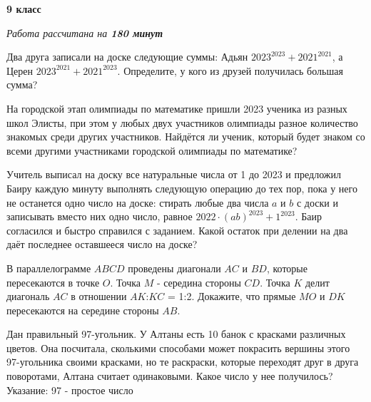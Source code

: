 \hspace{3mm}

\centerline{\bf \huge 9 класс}
\centerline{\normalsize{\it Работа рассчитана на \bf{180} минут}}

\hspace{3mm}

 Два друга записали на доске следующие суммы: Адьян $2023^{2023} + 2021^{2021}$, а Церен $2023^{2021} + 2021^{2023}.$ Определите, у кого из друзей получилась большая сумма?\

\hspace{3mm}

 На городской этап олимпиады по математике пришли 2023 ученика из разных школ Элисты, при этом у любых двух участников олимпиады разное количество знакомых среди других участников. Найдётся ли ученик, который будет знаком со всеми другими участниками городской олимпиады по математике? 

\hspace{3mm}

 Учитель выписал на доску все натуральные числа от 1 до 2023 и предложил Баиру каждую минуту выполнять следующую операцию до тех пор, пока у него не останется одно число на доске: стирать любые два числа $a$ и $b$ с доски и записывать вместо них одно число, равное $2022\cdot(ab)^{2023} + 1^{2023}$. Баир согласился и быстро справился с заданием. Какой остаток при делении на два даёт последнее оставшееся число на доске?

\hspace{3mm}

 В параллелограмме $ABCD$ проведены диагонали $AC$ и $BD$, которые пересекаются в точке $O$. Точка $M$ - середина стороны $CD$. Точка $K$ делит диагональ $AC$ в отношении $AK$:$KC$ = 1:2. Докажите, что прямые $MO$ и $DK$ пересекаются на середине стороны $AB$.

\hspace{3mm}

 Дан правильный 97-угольник. У Алтаны есть 10 банок с красками различных цветов. Она посчитала, сколькими способами может покрасить вершины этого 97-угольника своими красками, но те раскраски, которые переходят друг в друга поворотами, Алтана считает одинаковыми. Какое число у нее получилось? 
Указание: 97 - простое число
